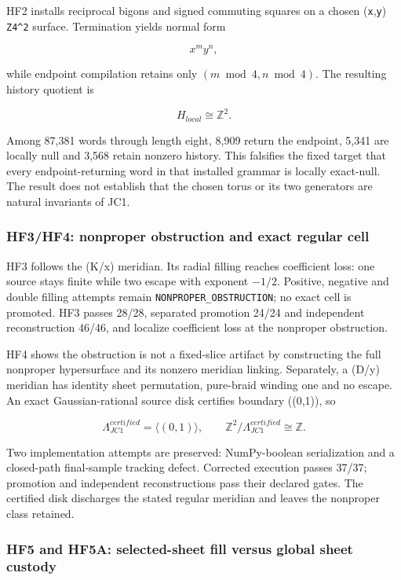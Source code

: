 HF2 installs reciprocal bigons and signed commuting squares on a chosen
(\texttt{x},\texttt{y}) \texttt{Z4\^{}2} surface. Termination yields
normal form

\[
x^my^n,
\]

while endpoint compilation retains only \((m\bmod4,n\bmod4)\). The
resulting history quotient is

\[
H_{local}\cong\mathbb Z^2.
\]

Among 87,381 words through length eight, 8,909 return the endpoint,
5,341 are locally null and 3,568 retain nonzero history. This falsifies
the fixed target that every endpoint-returning word in that installed
grammar is locally exact-null. The result does not establish that the
chosen torus or its two generators are natural invariants of JC1.

\subsubsection{HF3/HF4: nonproper obstruction and exact regular
cell}\label{viii-ch11-hf3hf4-nonproper-obstruction-and-exact-regular-cell}

HF3 follows the (K/x) meridian. Its radial filling reaches coefficient
loss: one source stays finite while two escape with exponent \(-1/2\).
Positive, negative and double filling attempts remain
\texttt{NONPROPER\_OBSTRUCTION}; no exact cell is promoted. HF3 passes
28/28, separated promotion 24/24 and independent reconstruction 46/46,
and localize coefficient loss at the nonproper obstruction.

HF4 shows the obstruction is not a fixed-slice artifact by constructing
the full nonproper hypersurface and its nonzero meridian linking.
Separately, a (D/y) meridian has identity sheet permutation, pure-braid
winding one and no escape. An exact Gaussian-rational source disk
certifies boundary ((0,1)), so

\[
\Lambda_{JC1}^{certified}=\langle(0,1)\rangle,
\qquad
\mathbb Z^2/\Lambda_{JC1}^{certified}\cong\mathbb Z.
\]

Two implementation attempts are preserved: NumPy-boolean serialization
and a closed-path final-sample tracking defect. Corrected execution
passes 37/37; promotion and independent reconstructions pass their
declared gates. The certified disk discharges the stated regular meridian and leaves the nonproper class retained.

\subsubsection{HF5 and HF5A: selected-sheet fill versus global sheet
custody}\label{viii-ch11-hf5-and-hf5a-selected-sheet-fill-versus-global-sheet-custody}

